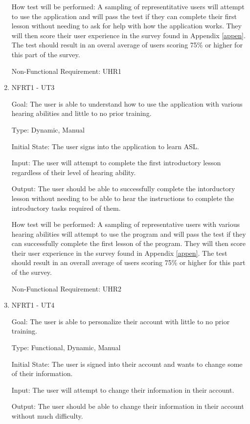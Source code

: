 \documentclass[12pt, titlepage]{article}
\begin{document}
\begin{enumerate}
How test will be performed: A sampling of representitative users will attempt to use the application and will pass the test if they can complete their first lesson without needing to ask for help with how the application works. They will then score their user experience in the survey found in Appendix \ref{appen}. The test should result in an overal average of users scoring 75\% or higher for this part of the survey. 

Non-Functional Requirement: UHR1
					
\item{NFRT1 - UT3}

Goal: The user is able to understand how to use the application with various hearing abilities and little to no prior training. 

Type: Dynamic, Manual
					
Initial State: The user signs into the application to learn ASL.
					
Input: The user will attempt to complete the first introductory lesson regardless of their level of hearing ability.
					
Output: The user should be able to successfully complete the intorductory lesson without needing to be able to hear the instructions to complete the introductory tasks required of them. 
					
How test will be performed: A sampling of representative users with various hearing abilities will attempt to use the program and will pass the test if they can successfully complete the first lesson of the program. They will then score their user experience in the survey found in Appendix \ref{appen}. The test should result in an overall average of users scoring 75\% or higher for this part of the survey. 

Non-Functional Requirement: UHR2

\item{NFRT1 - UT4}

Goal: The user is able to personalize their account with little to no prior training. 

Type: Functional, Dynamic, Manual
					
Initial State: The user is signed into their account and wants to change some of their information.
					
Input: The user will attempt to change their information in their account. 
					
Output: The user should be able to change their information in their account without much difficulty. 
					

\end{enumerate}
\end{document}
